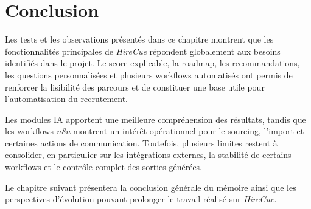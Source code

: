 \section{Conclusion}

Les tests et les observations présentés dans ce chapitre montrent que les fonctionnalités principales de \textit{HireCue} répondent globalement aux besoins identifiés dans le projet. Le score explicable, la roadmap, les recommandations, les questions personnalisées et plusieurs workflows automatisés ont permis de renforcer la lisibilité des parcours et de constituer une base utile pour l'automatisation du recrutement.

Les modules IA apportent une meilleure compréhension des résultats, tandis que les workflows \textit{n8n} montrent un intérêt opérationnel pour le sourcing, l'import et certaines actions de communication. Toutefois, plusieurs limites restent à consolider, en particulier sur les intégrations externes, la stabilité de certains workflows et le contrôle complet des sorties générées.

Le chapitre suivant présentera la conclusion générale du mémoire ainsi que les perspectives d'évolution pouvant prolonger le travail réalisé sur \textit{HireCue}.
